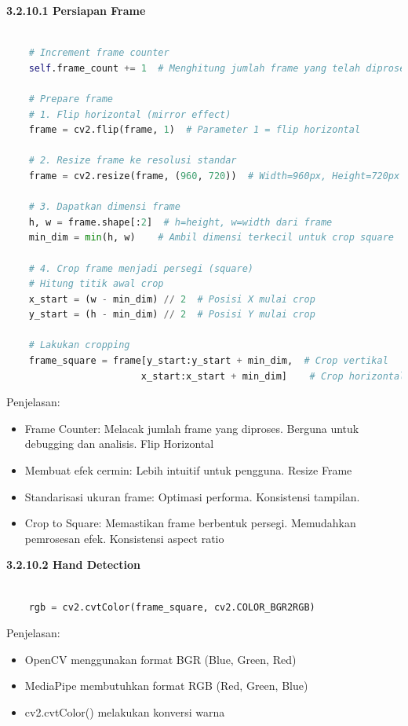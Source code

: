 \documentclass[11pt,a4paper]{article}
\begin{document}
    \noindent\textbf{3.2.10.1 Persiapan Frame}
    \begin{lstlisting}[language=Python, caption=Fungsi \textit{-update-hand-state}]
    
    # Increment frame counter
    self.frame_count += 1  # Menghitung jumlah frame yang telah diproses
    
    # Prepare frame
    # 1. Flip horizontal (mirror effect)
    frame = cv2.flip(frame, 1)  # Parameter 1 = flip horizontal
    
    # 2. Resize frame ke resolusi standar
    frame = cv2.resize(frame, (960, 720))  # Width=960px, Height=720px
    
    # 3. Dapatkan dimensi frame
    h, w = frame.shape[:2]  # h=height, w=width dari frame
    min_dim = min(h, w)    # Ambil dimensi terkecil untuk crop square
    
    # 4. Crop frame menjadi persegi (square)
    # Hitung titik awal crop
    x_start = (w - min_dim) // 2  # Posisi X mulai crop
    y_start = (h - min_dim) // 2  # Posisi Y mulai crop
    
    # Lakukan cropping
    frame_square = frame[y_start:y_start + min_dim,  # Crop vertikal
                        x_start:x_start + min_dim]    # Crop horizontal
    \end{lstlisting}
    Penjelasan:
    \begin{itemize}
        \item Frame Counter: Melacak jumlah frame yang diproses. Berguna untuk debugging dan analisis. Flip Horizontal
        \item Membuat efek cermin: Lebih intuitif untuk pengguna. Resize Frame
        \item Standarisasi ukuran frame: Optimasi performa. Konsistensi tampilan. 
        \item Crop to Square: Memastikan frame berbentuk persegi. Memudahkan pemrosesan efek. Konsistensi aspect ratio
    \end{itemize}
    

    \noindent\textbf{3.2.10.2 Hand Detection}
    \begin{lstlisting}[language=Python, caption=Konversi Warna]
    
    rgb = cv2.cvtColor(frame_square, cv2.COLOR_BGR2RGB)
    \end{lstlisting}
    Penjelasan:
    \begin{itemize}
        \item OpenCV menggunakan format BGR (Blue, Green, Red)
        \item MediaPipe membutuhkan format RGB (Red, Green, Blue)
        \item cv2.cvtColor() melakukan konversi warna
    \end{itemize}
\end{document}
